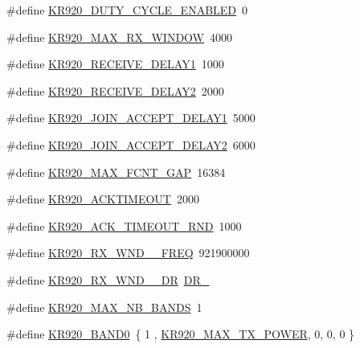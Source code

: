 \begin{DoxyCompactItemize}
\item 
\#define \mbox{\hyperlink{group___r_e_g_i_o_n_k_r920_ga397c5cdfee65398f7e9c7a47180cc0b2}{K\+R920\+\_\+\+D\+U\+T\+Y\+\_\+\+C\+Y\+C\+L\+E\+\_\+\+E\+N\+A\+B\+L\+ED}}~0
\item 
\#define \mbox{\hyperlink{group___r_e_g_i_o_n_k_r920_ga5e1950b2db0cb9812585e3350cad623a}{K\+R920\+\_\+\+M\+A\+X\+\_\+\+R\+X\+\_\+\+W\+I\+N\+D\+OW}}~4000
\item 
\#define \mbox{\hyperlink{group___r_e_g_i_o_n_k_r920_ga904678fc97b70ac1fc102cf5712892b4}{K\+R920\+\_\+\+R\+E\+C\+E\+I\+V\+E\+\_\+\+D\+E\+L\+A\+Y1}}~1000
\item 
\#define \mbox{\hyperlink{group___r_e_g_i_o_n_k_r920_gab54449881d40cbb65cf84a0cebf83295}{K\+R920\+\_\+\+R\+E\+C\+E\+I\+V\+E\+\_\+\+D\+E\+L\+A\+Y2}}~2000
\item 
\#define \mbox{\hyperlink{group___r_e_g_i_o_n_k_r920_ga732f8186b63eb943e2acbbc61eaf9725}{K\+R920\+\_\+\+J\+O\+I\+N\+\_\+\+A\+C\+C\+E\+P\+T\+\_\+\+D\+E\+L\+A\+Y1}}~5000
\item 
\#define \mbox{\hyperlink{group___r_e_g_i_o_n_k_r920_ga2f6e9182d6583e30c0436688ae3c680a}{K\+R920\+\_\+\+J\+O\+I\+N\+\_\+\+A\+C\+C\+E\+P\+T\+\_\+\+D\+E\+L\+A\+Y2}}~6000
\item 
\#define \mbox{\hyperlink{group___r_e_g_i_o_n_k_r920_ga1b3db0e7a3e9d4126c6ffa3731a50a34}{K\+R920\+\_\+\+M\+A\+X\+\_\+\+F\+C\+N\+T\+\_\+\+G\+AP}}~16384
\item 
\#define \mbox{\hyperlink{group___r_e_g_i_o_n_k_r920_ga274fcbad0638c07b7ee17dabaa76ea43}{K\+R920\+\_\+\+A\+C\+K\+T\+I\+M\+E\+O\+UT}}~2000
\item 
\#define \mbox{\hyperlink{group___r_e_g_i_o_n_k_r920_ga26ae76d76a56899ec2fd39c9c77b601b}{K\+R920\+\_\+\+A\+C\+K\+\_\+\+T\+I\+M\+E\+O\+U\+T\+\_\+\+R\+ND}}~1000
\item 
\#define \mbox{\hyperlink{group___r_e_g_i_o_n_k_r920_gac307ea5cebec6aef82e45e278f057bd2}{K\+R920\+\_\+\+R\+X\+\_\+\+W\+N\+D\+\_\+\_\+\+F\+R\+EQ}}~921900000
\item 
\#define \mbox{\hyperlink{group___r_e_g_i_o_n_k_r920_gaf3d1c630f1608c0a38f5ecc6dadb6abb}{K\+R920\+\_\+\+R\+X\+\_\+\+W\+N\+D\+\_\+\_\+\+DR}}~\mbox{\hyperlink{group___r_e_g_i_o_n_ga6c4ef966b4f3d5eb7597b087f2b97095}{D\+R\+\_}}
\item 
\#define \mbox{\hyperlink{group___r_e_g_i_o_n_k_r920_ga583dc0020ee40c41d888685baadfea12}{K\+R920\+\_\+\+M\+A\+X\+\_\+\+N\+B\+\_\+\+B\+A\+N\+DS}}~1
\item 
\#define \mbox{\hyperlink{group___r_e_g_i_o_n_k_r920_ga1bb003b2b2b3a0b0fae035b8e0aa58e5}{K\+R920\+\_\+\+B\+A\+N\+D0}}~\{ 1 , \mbox{\hyperlink{group___r_e_g_i_o_n_k_r920_ga83f7aad24311983622b179a74c3c80d0}{K\+R920\+\_\+\+M\+A\+X\+\_\+\+T\+X\+\_\+\+P\+O\+W\+ER}}, 0, 0, 0 \}

\end{DoxyCompactItemize}
